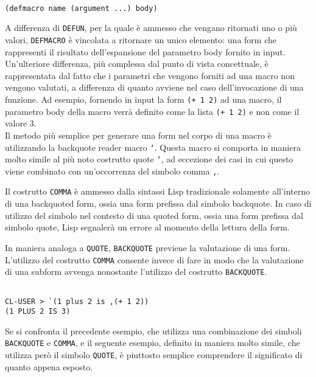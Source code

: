 \begin{lstlisting}[caption=Signature della macro DEFMACRO]

(defmacro name (argument ...) body)

\end{lstlisting}

A differenza di \texttt{DEFUN}, per la quale è ammesso che vengano ritornati uno
o più valori, \texttt{DEFMACRO} è vincolata a ritornare un unico elemento: una
form che rappresenti il risultato dell'espansione del parametro body fornito in
input. Un’ulteriore differenza, più complessa dal punto di vista concettuale, è
rappresentata dal fatto che i parametri che vengono forniti ad una macro non
vengono valutati, a differenza di quanto avviene nel caso dell’invocazione di
una funzione. Ad esempio, fornendo in input la form \texttt{(+ 1 2)} ad una
macro, il parametro body della macro verrà definito come la lista \texttt{(+ 1
2)} e non come il valore 3.\\

Il metodo più semplice per generare una form nel corpo di una macro è
utilizzando la backquote reader macro \texttt{`}. Questa macro si comporta in
maniera molto simile al più noto costrutto quote \texttt{‘}, ad eccezione dei
casi in cui questo viene combinato con un’occorrenza del simbolo comma
\texttt{,}.

Il costrutto \texttt{COMMA} è ammesso dalla sintassi Lisp tradizionale solamente
all’interno di una backquoted form, ossia una form prefissa dal simbolo
backquote. In caso di utilizzo del simbolo nel contesto di una quoted form,
ossia una form prefissa dal simbolo quote, Lisp segnalerà un errore al momento
della lettura della form.

In maniera analoga a \texttt{QUOTE}, \texttt{BACKQUOTE} previene la valutazione
di una form. L’utilizzo del costrutto \texttt{COMMA} consente invece di fare in
modo che la valutazione di una subform avvenga nonostante l’utilizzo del
costrutto \texttt{BACKQUOTE}.

\begin{lstlisting}

CL-USER > `(1 plus 2 is ,(+ 1 2))
(1 PLUS 2 IS 3)

\end{lstlisting}

Se si confronta il precedente esempio, che utilizza una combinazione dei simboli
\texttt{BACKQUOTE} e \texttt{COMMA}, e il seguente esempio, definito in maniera
molto simile, che utilizza però il simbolo \texttt{QUOTE}, è piuttosto semplice
comprendere il significato di quanto appena esposto.

